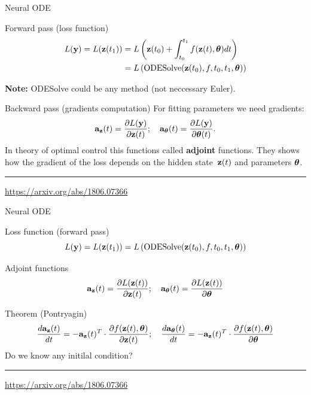\begin{frame}{Neural ODE}
	\begin{block}{Forward pass (loss function)}
		\vspace{-0.5cm}
		\begin{align*}
			L(\mathbf{y}) = L(\mathbf{z}(t_1)) &= L\left( \mathbf{z}(t_0) + \int_{t_0}^{t_1} f(\mathbf{z}(t), \boldsymbol{\theta}) dt \right) \\ &= L\left(\text{ODESolve}(\mathbf{z}(t_0), f, t_0,t_1, \boldsymbol{\theta}) \right)
		\end{align*}
	\vspace{-0.5cm}
	\end{block}
	\textbf{Note:} ODESolve could be any method (not neccessary Euler).
	\begin{block}{Backward pass (gradients computation)}
		For fitting parameters we need gradients:
		\[
		\mathbf{a}_{\mathbf{z}}(t) = \frac{\partial L(\mathbf{y})}{\partial \mathbf{z}(t)}; \quad \mathbf{a}_{\boldsymbol{\theta}}(t) = \frac{\partial L(\mathbf{y})}{\partial \boldsymbol{\theta}(t)}.
		\]
		In theory of optimal control this functions called \textbf{adjoint} functions. 
		They shows how the gradient of the loss depends on the hidden state~$\mathbf{z}(t)$ and parameters $\boldsymbol{\theta}$.
	\end{block}
	\vspace{0.1cm}
		
	\hrule\medskip
	{\scriptsize \href{https://arxiv.org/abs/1806.07366}{https://arxiv.org/abs/1806.07366}}   
\end{frame}
\begin{frame}{Neural ODE}
	\begin{block}{Loss function (forward pass)}
	\vspace{-0.2cm}
	\[
	    L(\mathbf{y}) = L(\mathbf{z}(t_1)) = L\left(\text{ODESolve}(\mathbf{z}(t_0), f, t_0,t_1, \boldsymbol{\theta}) \right)
	\]
	\vspace{-0.3cm}
	\end{block}
	\begin{block}{Adjoint functions}
	\vspace{-0.2cm}
	\[
	    \mathbf{a}_{\mathbf{z}}(t) = \frac{\partial L(\mathbf{z}(t))}{\partial \mathbf{z}(t)}; \quad \mathbf{a}_{\boldsymbol{\theta}}(t) = \frac{\partial L(\mathbf{z}(t))}{\partial \boldsymbol{\theta}}
	\]
	\vspace{-0.2cm}
	\end{block}
	\begin{block}{Theorem (Pontryagin)}
	\vspace{-0.3cm}
	\[
	    \frac{d \mathbf{a}_{\mathbf{z}}(t)}{dt} = - \mathbf{a}_{\mathbf{z}}(t)^T \cdot \frac{\partial f(\mathbf{z}(t), \boldsymbol{\theta})}{\partial \mathbf{z}(t)}; \quad  \frac{d \mathbf{a}_{\boldsymbol{\theta}}(t)}{dt} = - \mathbf{a}_{\mathbf{z}}(t)^T \cdot \frac{\partial f(\mathbf{z}(t), \boldsymbol{\theta})}{\partial \boldsymbol{\theta}}
	\]
	Do we know any initilal condition?
	\end{block}
	 \vfill
	\hrule\medskip
	{\scriptsize \href{https://arxiv.org/abs/1806.07366}{https://arxiv.org/abs/1806.07366}}   
\end{frame}
